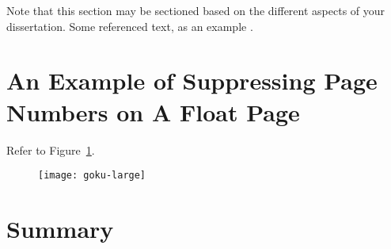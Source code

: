 Note that this section may be sectioned based on the different aspects of your dissertation.  Some referenced text, as an example \citep{Arrighi2003, WithersMartinez2012, Ebejer2016}.

\section{An Example of Suppressing Page Numbers on A Float Page}

Refer to Figure~\ref{fig:largegoku}.

\begin{figure}[!ht]
	\centering
	\texttt{[image: goku-large]}
	\caption[Short Random Caption]{\blindtext}        
	\label{fig:largegoku}
\end{figure}

\blindtext

\section{Summary}
\blindtext